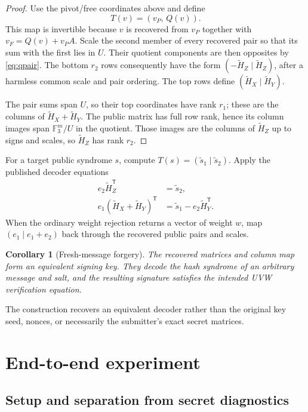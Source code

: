 \documentclass[11pt,a4paper]{article}
\newtheorem{corollary}[theorem]{Corollary}
\newcommand{\F}{\mathbb{F}}
\begin{document}
\begin{proof}
Use the pivot/free coordinates above and define
\[
                  T(v)=(v_P,\,Q(v)).
\]
This map is invertible because $v$ is recovered from $v_P$ together with
$v_F=Q(v)+v_PA$.  Scale the second member of every recovered
pair so that its sum with the first lies in $U$.  Their quotient components
are then opposites by \eqref{eq:qpair}.  The bottom $r_2$ rows consequently
have the form $(-\widetilde H_Z\mid\widetilde H_Z)$, after a harmless common
scale and pair ordering.  The top rows define
$(\widetilde H_X\mid\widetilde H_Y)$.

The pair sums span $U$, so their top coordinates have rank $r_1$; these are
the columns of $\widetilde H_X+\widetilde H_Y$.  The public matrix has full
row rank, hence its column images span $\F_3^m/U$ in the quotient.  Those
images are the columns of $\widetilde H_Z$ up to signs and scales, so
$\widetilde H_Z$ has rank $r_2$.
\end{proof}

For a target public syndrome $s$, compute
$T(s)=(\widetilde s_1\mid\widetilde s_2)$.  Apply the published decoder
equations
\begin{align*}
 e_2\widetilde H_Z^{\mathsf T}&=\widetilde s_2,\\
 e_1(\widetilde H_X+\widetilde H_Y)^{\mathsf T}
   &=\widetilde s_1-e_2\widetilde H_Y^{\mathsf T}.
\end{align*}
When the ordinary weight rejection returns a vector of weight $w$, map
$(e_1\mid e_1+e_2)$ back through the recovered public pairs and scales.

\begin{corollary}[Fresh-message forgery]
The recovered matrices and column map form an equivalent signing key.  They
decode the hash syndrome of an arbitrary message and salt, and the resulting
signature satisfies the intended UVW verification equation.
\end{corollary}

The construction recovers an equivalent decoder rather than the original
key seed, nonces, or necessarily the submitter's exact secret matrices.

\section{End-to-end experiment}

\subsection{Setup and separation from secret diagnostics}
\end{document}
